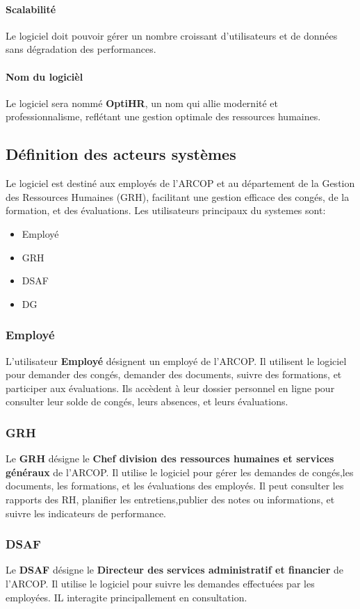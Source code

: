 \paragraph{Scalabilité}
Le logiciel doit pouvoir gérer un nombre croissant d'utilisateurs et de données sans dégradation des performances.


\paragraph{Nom du logicièl}
Le logiciel sera nommé \textbf{OptiHR}, un nom qui allie modernité et professionnalisme, reflétant une gestion
optimale des ressources humaines.


\subsection{Définition des acteurs systèmes}
Le logiciel est destiné aux employés de l’\ac{ARCOP} et au département de la Gestion des Ressources Humaines (GRH), facilitant une gestion efficace des congés, de la formation, et des évaluations.
Les utilisateurs principaux du systemes sont:
\begin{itemize}
    \item Employé 
    \item GRH 
    \item DSAF 
    \item DG 
\end{itemize}
\subsubsection{Employé}
L'utilisateur \textbf{Employé} désignent un employé de l'\ac{ARCOP}. Il utilisent le logiciel pour demander des congés, demander des documents, suivre des formations, et participer aux évaluations. Ils accèdent à leur dossier personnel en ligne pour consulter leur solde de congés, leurs absences, et leurs évaluations.
\subsubsection{GRH}
Le \textbf{GRH} désigne le \textbf{Chef division des ressources humaines et services généraux} de l'\ac{ARCOP}. Il utilise le logiciel pour gérer les demandes de congés,les documents, les formations, et les évaluations des employés. Il peut consulter les rapports des \ac{RH}, planifier les entretiens,publier des notes ou informations, et suivre les indicateurs de performance.
\subsubsection{DSAF }
Le \textbf{DSAF} désigne le \textbf{ Directeur des services administratif et financier} de l'\ac{ARCOP}. Il utilise le logiciel pour suivre les demandes effectuées par les employées. IL interagite principallement en consultation.

